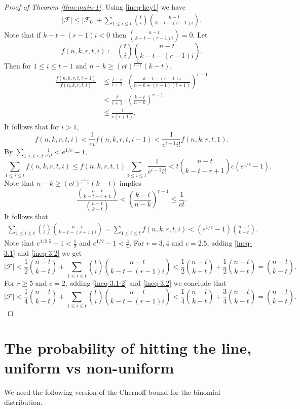 \documentclass[11pt,a4paper]{article}
\newtheorem{false statement}{False statement}
\theoremstyle{definition}
\def\hf{\mathcal{F}}
\begin{document}
\begin{proof}[Proof of Theorem \ref{thm:main-1}]
Using \eqref{ineq-key1} we have
\begin{align*}
|\hf| \leq   |\hf_0|+\sum_{1\leq i\leq t} \binom{t}{i}\binom{n-t}{k-t-(r-1)i}.
\end{align*}
Note that if $k-t-(r-1)i<0$ then $\binom{n-t}{k-t-(r-1)i}=0$.
Let
\[
f(n,k,r,t,i) := \binom{t}{i}\binom{n-t}{k-t-(r-1)i}.
\]
Then for $1\leq i\leq t-1$ and $n-k\geq (ct)^{\frac{1}{r-1}}(k-t)$,
\begin{align*}
\frac{f(n,k,r,t,i+1)}{f(n,k,r,t,i)}&\leq \frac{t-i}{i+1} \cdot \left(\frac{k-t-(r-1)i}{n-k+(r-1)(i+1)}\right)^{r-1}\\[3pt]
&< \frac{t}{i+1} \cdot \left(\frac{k-t}{n-k}\right)^{r-1}\\[3pt]
&\leq \frac{1}{c(i+1)}.
\end{align*}
It follows that for $i> 1$,
\[
f(n,k,r,t,i) < \frac{1}{ci}f(n,k,r,t,i-1) < \frac{1}{c^{i-1}i!}f(n,k,r,t,1).
\]
By $\sum\limits_{1\leq i\leq t}\frac{1}{c^{i}i!} <e^{1/c}-1$,
\[
\sum_{1\leq i\leq t} f(n,k,r,t,i) \leq  f(n,k,r,t,1)\sum_{1\leq i\leq t}\frac{1}{c^{i-1}i!}< t\binom{n-t}{k-t-r+1} c(e^{1/c}-1).
\]
Note that $n-k\geq (ct)^{\frac{1}{r-1}}(k-t)$ implies
\[
\frac{\binom{n-t}{k-t-r+1}}{\binom{n-t}{k-t}} < \left(\frac{k-t}{n-k}\right)^{r-1}\leq  \frac{1}{ct}.
\]
It follows that
\begin{align}\label{ineq-3.2}
\sum_{1\leq i\leq t} \binom{t}{i}\binom{n-t}{k-t-(r-1)i} =\sum_{1\leq i\leq t} f(n,k,r,t,i) <(e^{1/c}-1)\binom{n-t}{k-t}.
\end{align}
Note that $e^{1/2.5}-1<\frac{1}{2}$ and $e^{1/2}-1<\frac{3}{4}$. For $r=3,4$ and  $c=2.5$, adding \eqref{ineq-3.1} and \eqref{ineq-3.2} we get
\[
|\hf|<\frac{1}{2} \binom{n-t}{k-t}+\sum_{1\leq i\leq t} \binom{t}{i}\binom{n-t}{k-t-(r-1)i}<\frac{1}{2} \binom{n-t}{k-t}+\frac{1}{2} \binom{n-t}{k-t}=\binom{n-t}{k-t}.
\]
For $r\geq 5$ and $c=2$, adding \eqref{ineq-3.1-2} and \eqref{ineq-3.2}  we conclude that
\[
|\hf|<\frac{1}{4} \binom{n-t}{k-t}+\sum_{1\leq i\leq t} \binom{t}{i}\binom{n-t}{k-t-(r-1)i}<\frac{1}{4} \binom{n-t}{k-t}+\frac{3}{4} \binom{n-t}{k-t}=\binom{n-t}{k-t}.
\]
\end{proof}





\section{The probability of hitting the line, uniform vs non-uniform}


We need the following version of the Chernoff bound for the binomial distribution.
\end{document}

